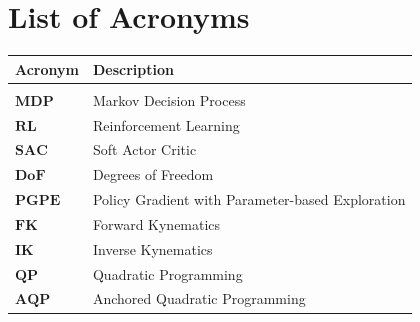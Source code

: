 \listoffigures

\listoftables

\chapter*{List of Acronyms} %
\begin{table}[H]
    \centering
    \begin{tabular}{ll}
        \textbf{Acronym} & \textbf{Description} \\\hline\\[-9px]
        $\bm{MDP}$ & Markov Decision Process \\[2px]
        $\bm{RL}$ & Reinforcement Learning \\[2px]
        $\bm{SAC}$ & Soft Actor Critic  \\[2px]
        $\bm{DoF}$ & Degrees of Freedom \\[2px]
        $\bm{PGPE}$ & Policy Gradient with Parameter-based Exploration \\[2px]
        $\bm{FK}$ & Forward Kynematics \\[2px]
        $\bm{IK}$ & Inverse Kynematics \\[2px]
        $\bm{QP}$ & Quadratic Programming \\[2px]
        $\bm{AQP}$ & Anchored Quadratic Programming \\[2px]
    \end{tabular}
\end{table}



\cleardoublepage